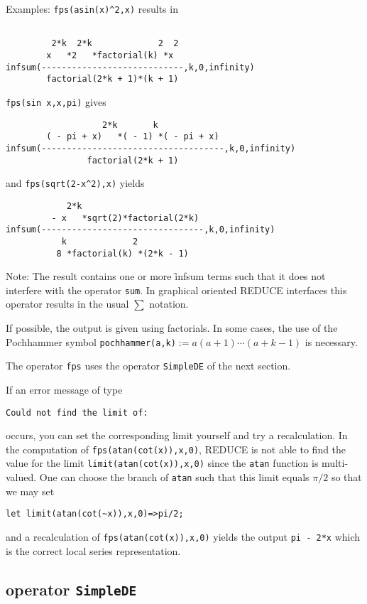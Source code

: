 Examples: \texttt{fps(asin(x)\textasciicircum2,x)} results in
\begin{verbatim}

         2*k  2*k             2  2
        x   *2   *factorial(k) *x
infsum(----------------------------,k,0,infinity)
        factorial(2*k + 1)*(k + 1)
\end{verbatim}
\texttt{fps(sin x,x,pi)} gives
\begin{verbatim}
                   2*k       k
        ( - pi + x)   *( - 1) *( - pi + x)
infsum(------------------------------------,k,0,infinity)
                factorial(2*k + 1)
\end{verbatim}
and \texttt{fps(sqrt(2-x\textasciicircum2),x)} yields
\begin{verbatim}
            2*k
         - x   *sqrt(2)*factorial(2*k)
infsum(--------------------------------,k,0,infinity)
           k             2
          8 *factorial(k) *(2*k - 1)
\end{verbatim}
\hypertarget{operator:INFSUM}{}
Note: The result contains one or more \f{infsum} terms such that it does
not interfere with the {\REDUCE} operator \texttt{sum}. In graphical oriented
REDUCE interfaces this operator results in the usual $\sum$ notation.

If possible, the output is given using factorials. In some cases, the
use of the Pochhammer symbol \texttt{pochhammer(a,k)}$:=a(a+1)\cdots(a+k-1)$
is necessary.

The operator \texttt{fps} uses the operator \texttt{SimpleDE} of the next section.

If an error message of type
\begin{verbatim}
Could not find the limit of:
\end{verbatim}
occurs, you can set the corresponding limit yourself and try a
recalculation. In the computation of \texttt{fps(atan(cot(x)),x,0)},
REDUCE is not able to find the value for the limit 
\texttt{limit(atan(cot(x)),x,0)} since the \texttt{atan} function is multi-valued.
One can choose the branch of \texttt{atan} such that this limit equals
$\pi/2$ so that we may set 
\begin{verbatim}
let limit(atan(cot(~x)),x,0)=>pi/2;
\end{verbatim}
and a recalculation of \texttt{fps(atan(cot(x)),x,0)}
yields the output \texttt{pi - 2*x} which is
the correct local series representation.

\subsection{\REDUCE{} operator \texttt{SimpleDE}}
\hypertarget{operator:SIMPLEDE}{}

